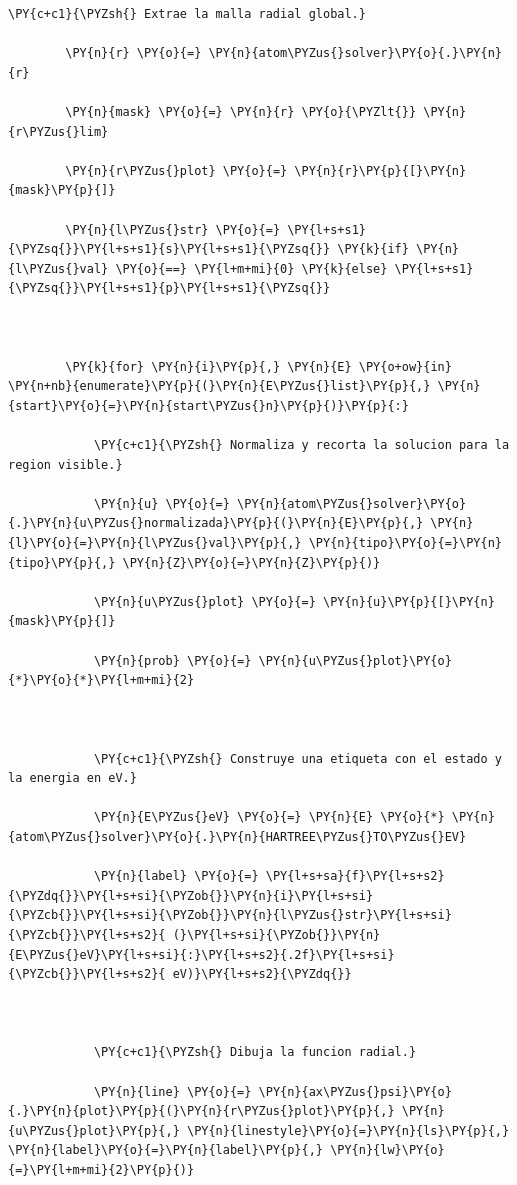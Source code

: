 \documentclass[11pt]{article}
\makeatletter
\def\PY@reset{\let\PY@it=\relax \let\PY@bf=\relax \let\PY@ul=\relax \let\PY@tc=\relax \let\PY@bc=\relax \let\PY@ff=\relax}
\def\PY@tok#1{\csname PY@tok@#1\endcsname}
\def\PY@toks#1+{\ifx\relax#1\empty\else \PY@tok{#1}\expandafter\PY@toks\fi}
\def\PY@do#1{\PY@bc{\PY@tc{\PY@ul{\PY@it{\PY@bf{\PY@ff{#1}}}}}}}
\def\PY#1#2{\PY@reset\PY@toks#1+\relax+\PY@do{#2}}
\makeatother
\begin{document}
\begin{tcolorbox}[breakable, size=fbox, boxrule=1pt, pad at break*=1mm,colback=cellbackground, colframe=cellborder]
\begin{Verbatim}[commandchars=\\\{\}]
        \PY{c+c1}{\PYZsh{} Extrae la malla radial global.}

        \PY{n}{r} \PY{o}{=} \PY{n}{atom\PYZus{}solver}\PY{o}{.}\PY{n}{r}

        \PY{n}{mask} \PY{o}{=} \PY{n}{r} \PY{o}{\PYZlt{}} \PY{n}{r\PYZus{}lim}

        \PY{n}{r\PYZus{}plot} \PY{o}{=} \PY{n}{r}\PY{p}{[}\PY{n}{mask}\PY{p}{]}

        \PY{n}{l\PYZus{}str} \PY{o}{=} \PY{l+s+s1}{\PYZsq{}}\PY{l+s+s1}{s}\PY{l+s+s1}{\PYZsq{}} \PY{k}{if} \PY{n}{l\PYZus{}val} \PY{o}{==} \PY{l+m+mi}{0} \PY{k}{else} \PY{l+s+s1}{\PYZsq{}}\PY{l+s+s1}{p}\PY{l+s+s1}{\PYZsq{}}

        

        \PY{k}{for} \PY{n}{i}\PY{p}{,} \PY{n}{E} \PY{o+ow}{in} \PY{n+nb}{enumerate}\PY{p}{(}\PY{n}{E\PYZus{}list}\PY{p}{,} \PY{n}{start}\PY{o}{=}\PY{n}{start\PYZus{}n}\PY{p}{)}\PY{p}{:}

            \PY{c+c1}{\PYZsh{} Normaliza y recorta la solucion para la region visible.}

            \PY{n}{u} \PY{o}{=} \PY{n}{atom\PYZus{}solver}\PY{o}{.}\PY{n}{u\PYZus{}normalizada}\PY{p}{(}\PY{n}{E}\PY{p}{,} \PY{n}{l}\PY{o}{=}\PY{n}{l\PYZus{}val}\PY{p}{,} \PY{n}{tipo}\PY{o}{=}\PY{n}{tipo}\PY{p}{,} \PY{n}{Z}\PY{o}{=}\PY{n}{Z}\PY{p}{)}

            \PY{n}{u\PYZus{}plot} \PY{o}{=} \PY{n}{u}\PY{p}{[}\PY{n}{mask}\PY{p}{]}

            \PY{n}{prob} \PY{o}{=} \PY{n}{u\PYZus{}plot}\PY{o}{*}\PY{o}{*}\PY{l+m+mi}{2}

            

            \PY{c+c1}{\PYZsh{} Construye una etiqueta con el estado y la energia en eV.}

            \PY{n}{E\PYZus{}eV} \PY{o}{=} \PY{n}{E} \PY{o}{*} \PY{n}{atom\PYZus{}solver}\PY{o}{.}\PY{n}{HARTREE\PYZus{}TO\PYZus{}EV}

            \PY{n}{label} \PY{o}{=} \PY{l+s+sa}{f}\PY{l+s+s2}{\PYZdq{}}\PY{l+s+si}{\PYZob{}}\PY{n}{i}\PY{l+s+si}{\PYZcb{}}\PY{l+s+si}{\PYZob{}}\PY{n}{l\PYZus{}str}\PY{l+s+si}{\PYZcb{}}\PY{l+s+s2}{ (}\PY{l+s+si}{\PYZob{}}\PY{n}{E\PYZus{}eV}\PY{l+s+si}{:}\PY{l+s+s2}{.2f}\PY{l+s+si}{\PYZcb{}}\PY{l+s+s2}{ eV)}\PY{l+s+s2}{\PYZdq{}}

            

            \PY{c+c1}{\PYZsh{} Dibuja la funcion radial.}

            \PY{n}{line} \PY{o}{=} \PY{n}{ax\PYZus{}psi}\PY{o}{.}\PY{n}{plot}\PY{p}{(}\PY{n}{r\PYZus{}plot}\PY{p}{,} \PY{n}{u\PYZus{}plot}\PY{p}{,} \PY{n}{linestyle}\PY{o}{=}\PY{n}{ls}\PY{p}{,} \PY{n}{label}\PY{o}{=}\PY{n}{label}\PY{p}{,} \PY{n}{lw}\PY{o}{=}\PY{l+m+mi}{2}\PY{p}{)}


\end{Verbatim}
\end{tcolorbox}
\end{document}
